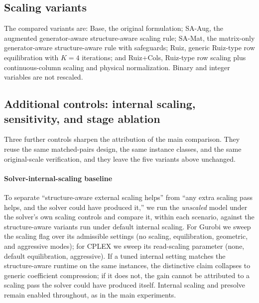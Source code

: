 \documentclass[AMA,Times1COL]{WileyNJDv5} %
\newcommand{\methodBase}{Base}
\newcommand{\methodAug}{SA-Aug}
\newcommand{\methodMat}{SA-Mat}
\newcommand{\methodRuiz}{Ruiz}
\newcommand{\methodRuizCols}{Ruiz+Cols}
\providecommand{\DIFadd}[1]{{\protect\color{blue} \sf #1}} %
\providecommand{\DIFdel}[1]{{\protect\color{red} \scriptsize #1}} %
\providecommand{\DIFaddbegin}{} %
\providecommand{\DIFaddend}{} %
\providecommand{\DIFdelbegin}{} %
\providecommand{\DIFdelend}{} %
\begin{document}
\subsection{Scaling variants}
\label{subsec:variants}

The compared variants are: \methodBase{}, the original formulation; \methodAug{},
the augmented \DIFdelbegin \DIFdel{generator-aware }\DIFdelend \DIFaddbegin \DIFadd{structure-aware }\DIFaddend scaling rule; \methodMat{}, the matrix-only
\DIFdelbegin \DIFdel{generator-aware }\DIFdelend \DIFaddbegin \DIFadd{structure-aware }\DIFaddend rule with safeguards; \methodRuiz{}, generic Ruiz-type row
equilibration with $K=4$ iterations; and \methodRuizCols{}, Ruiz-type row scaling plus
continuous-column scaling and physical normalization. Binary and integer variables are
not rescaled.

\DIFaddbegin \subsection{\DIFadd{Additional controls: internal scaling, sensitivity, and stage ablation}}
\label{subsec:added-controls}

\DIFadd{Three further controls sharpen the attribution of the main comparison. They reuse the same
matched-pairs design, the same instance classes, and the same original-scale verification,
and they leave the five variants above unchanged.
}

\paragraph{\DIFadd{Solver-internal-scaling baseline}}
\DIFadd{To separate ``structure-aware external scaling helps'' from ``any extra scaling pass
helps, and the solver could have produced it,'' we run the \emph{unscaled} model under the
solver's own scaling controls and compare it, within each scenario, against the
structure-aware variants run under default internal scaling. For Gurobi we sweep the scaling
flag over its admissible settings (no scaling, equilibration, geometric, and aggressive
modes); for CPLEX we sweep its read-scaling parameter (none, default equilibration,
aggressive). If a tuned internal setting matches the structure-aware runtime on the same
instances, the distinctive claim collapses to generic coefficient compression; if it does
not, the gain cannot be attributed to a scaling pass the solver could have produced itself.
Internal scaling and presolve remain enabled throughout, as in the main experiments.
}
\end{document}
